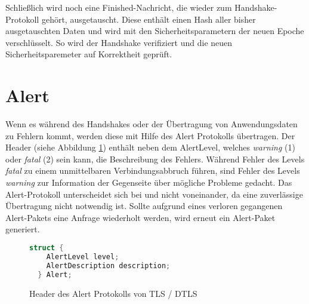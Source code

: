 Schließlich wird noch eine Finished-Nachricht, die wieder zum Handshake-Protokoll gehört, ausgetauscht. Diese enthält einen Hash aller bisher ausgetauschten Daten
und wird mit den Sicherheitsparametern der neuen Epoche verschlüsselt. So wird der Handshake verifiziert und die neuen Sicherheitsparemeter auf Korrektheit geprüft.

\section{Alert}

Wenn es während des Handshakes oder der Übertragung von Anwendungsdaten zu Fehlern kommt, werden diese mit Hilfe des Alert Protokolls übertragen.
Der Header (siehe Abbildung \ref{fig:alertlayer}) enthält neben dem AlertLevel, welches \textit{warning} (1) oder \textit{fatal} (2) sein kann,
die Beschreibung des Fehlers. Während Fehler des Levels \textit{fatal} zu einem unmittelbaren Verbindungsabbruch führen, sind Fehler des Levels
\textit{warning} zur Information der Gegenseite über mögliche Probleme gedacht. Das Alert-Protokoll unterscheidet sich bei  und 
nicht voneinander, da eine zuverlässige Übertragung nicht notwendig ist. Sollte aufgrund eines verloren gegangenen Alert-Pakets eine Anfrage
wiederholt werden, wird erneut ein Alert-Paket generiert.

\begin{figure}[ht]
  \centering
  \begin{lstlisting}[language=c]
  struct {
    AlertLevel level;
    AlertDescription description;
  } Alert;
  \end{lstlisting}
  \caption{Header des Alert Protokolls von TLS / DTLS}
  \label{fig:alertlayer}
\end{figure}